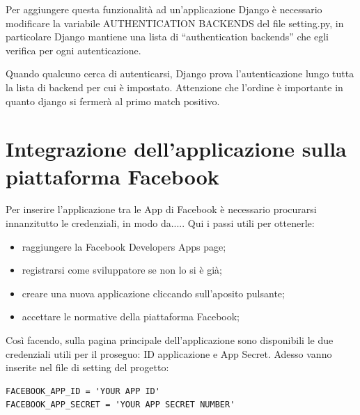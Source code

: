 Per aggiungere questa funzionalità ad un'applicazione Django è necessario modificare la variabile AUTHENTICATION BACKENDS del file setting.py, in particolare Django mantiene una lista di “authentication backends” che egli verifica per ogni autenticazione. 


Quando qualcuno cerca di autenticarsi, Django prova l'autenticazione lungo tutta la lista di backend per cui è impostato. 
Attenzione che l'ordine è importante in quanto django si fermerà al primo match positivo.


\section{Integrazione dell'applicazione sulla piattaforma Facebook}
Per inserire l'applicazione tra le App di Facebook è necessario procurarsi innanzitutto le credenziali, in modo da.....
Qui i passi utili per ottenerle:
\begin{itemize}
	\item raggiungere la Facebook Developers Apps page;
	\item registrarsi come sviluppatore se non lo si è già;
	\item creare una nuova applicazione cliccando sull'aposito pulsante;
	\item accettare le normative della piattaforma Facebook;
\end{itemize}
Così facendo, sulla pagina principale dell'applicazione sono disponibili le due credenziali utili per il proseguo: ID applicazione e App Secret.
Adesso vanno inserite nel file di setting del progetto:

\begin{shaded}
\begin{lstlisting}
FACEBOOK_APP_ID = 'YOUR APP ID'
FACEBOOK_APP_SECRET = 'YOUR APP SECRET NUMBER'
\end{lstlisting}
\end{shaded}

